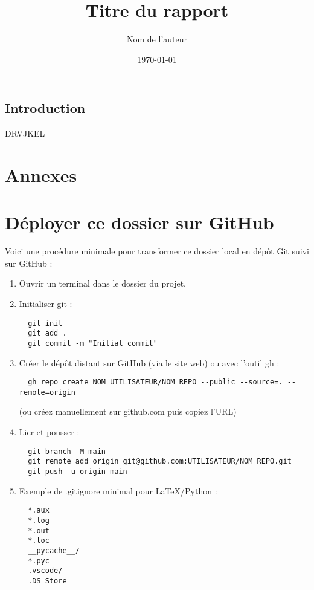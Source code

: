 \documentclass[12pt,a4paper]{report}
\title{Titre du rapport}
\author{Nom de l'auteur}
\date{\today}
\begin{document}
\maketitle

\section{Introduction}
DRVJKEL

\appendix
\chapter{Annexes}

\chapter{Déployer ce dossier sur GitHub}
Voici une procédure minimale pour transformer ce dossier local en dépôt Git suivi sur GitHub :

\begin{enumerate}
  \item Ouvrir un terminal dans le dossier du projet.
  \item Initialiser git :
  \begin{verbatim}
  git init
  git add .
  git commit -m "Initial commit"
  \end{verbatim}
  \item Créer le dépôt distant sur GitHub (via le site web) ou avec l'outil gh :
  \begin{verbatim}
  gh repo create NOM_UTILISATEUR/NOM_REPO --public --source=. --remote=origin
  \end{verbatim}
  (ou créez manuellement sur github.com puis copiez l'URL)
  \item Lier et pousser :
  \begin{verbatim}
  git branch -M main
  git remote add origin git@github.com:UTILISATEUR/NOM_REPO.git
  git push -u origin main
  \end{verbatim}
  \item Exemple de .gitignore minimal pour LaTeX/Python :
  \begin{verbatim}
  *.aux
  *.log
  *.out
  *.toc
  __pycache__/
  *.pyc
  .vscode/
  .DS_Store
  \end{verbatim}
\end{enumerate}
\end{document}
